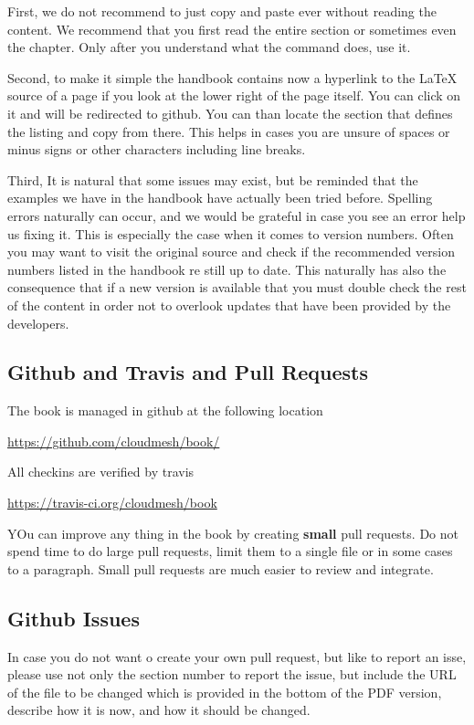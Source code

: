 First, we do not recommend to just copy and paste ever without reading
the content. We recommend that you first read the entire section or
sometimes even the chapter. Only after you understand what the command
does, use it.

Second, to make it simple the handbook contains now a hyperlink to the
LaTeX source of a page if you look at the lower right of the page
itself. You can click on it and will be redirected to github. You can
than locate the section that defines the listing and copy from
there. This helps in cases you are unsure of spaces or minus signs or
other characters including line breaks.

Third, It is natural that some issues may exist, but be reminded that
the examples we have in the handbook have actually been tried
before. Spelling errors naturally can occur, and we would be grateful
in case you see an error help us fixing it. This is especially the case
when it comes to version numbers. Often you may want to visit the
original source and check if the recommended version numbers listed in
the handbook re still up to date. This naturally has also the
consequence that if a new version is available that you must double
check the rest of the content in order not to overlook updates that
have been provided by the developers.

\subsection{Github and Travis and Pull Requests}

The book is managed in github at the following location

\url{https://github.com/cloudmesh/book/}

All checkins are verified by travis

\url{https://travis-ci.org/cloudmesh/book}

YOu can improve any thing in the book by creating {\bf small} pull
requests. Do not spend time to do large pull requests, limit them to a
single file or in some cases to a paragraph. Small pull requests are
much easier to review and integrate.

\subsection{Github Issues}

In case you do not want o create your own pull request, but like to
report an isse, please use not only the section number to report the
issue, but include the URL of the file to be changed which is provided
in the bottom of the PDF version, describe how it is now, and how it
should be changed.

